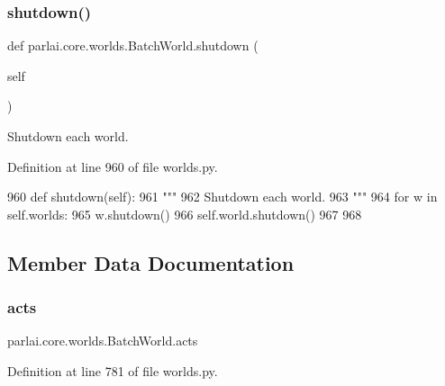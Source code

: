 \subsubsection{\texorpdfstring{shutdown()}{shutdown()}}
{\footnotesize\ttfamily def parlai.\+core.\+worlds.\+Batch\+World.\+shutdown (\begin{DoxyParamCaption}\item[{}]{self }\end{DoxyParamCaption})}

\begin{DoxyVerb}Shutdown each world.
\end{DoxyVerb}
 

Definition at line 960 of file worlds.\+py.


\begin{DoxyCode}
960     \textcolor{keyword}{def }shutdown(self):
961         \textcolor{stringliteral}{"""}
962 \textcolor{stringliteral}{        Shutdown each world.}
963 \textcolor{stringliteral}{        """}
964         \textcolor{keywordflow}{for} w \textcolor{keywordflow}{in} self.worlds:
965             w.shutdown()
966         self.world.shutdown()
967 
968 
\end{DoxyCode}


\subsection{Member Data Documentation}
\mbox{\label{classparlai_1_1core_1_1worlds_1_1BatchWorld_a89bd00f625520bf66dda7d113cf0b40e}} 
\subsubsection{\texorpdfstring{acts}{acts}}
{\footnotesize\ttfamily parlai.\+core.\+worlds.\+Batch\+World.\+acts}



Definition at line 781 of file worlds.\+py.

\mbox{\label{classparlai_1_1core_1_1worlds_1_1BatchWorld_a6f13286dedb14f257e043339b543cdeb}} 
